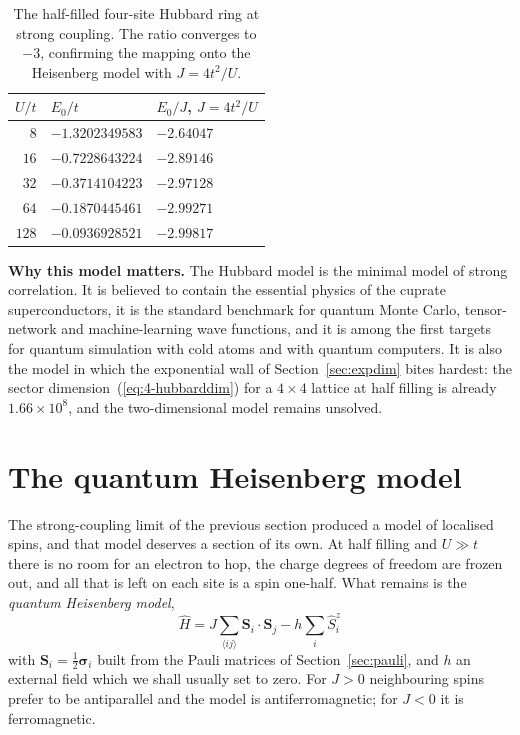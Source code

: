 \begin{table}[h]
\centering
\renewcommand{\arraystretch}{1.25}
\setlength{\tabcolsep}{14pt}
\begin{tabular}{rll}
\toprule
$U/t$ & $E_0/t$ & $E_0/J$, \quad $J=4t^2/U$\\
\midrule
$8$   & $-1.3202349583$ & $-2.64047$\\
$16$  & $-0.7228643224$ & $-2.89146$\\
$32$  & $-0.3714104223$ & $-2.97128$\\
$64$  & $-0.1870445461$ & $-2.99271$\\
$128$ & $-0.0936928521$ & $-2.99817$\\
\bottomrule
\end{tabular}
\caption{The half-filled four-site Hubbard ring at strong coupling.  The ratio
converges to $-3$, confirming the mapping onto the Heisenberg model with
$J=4t^2/U$.}
\label{tab:hubbardstrong}
\end{table}

\begin{notebox}
\textbf{Why this model matters.} The Hubbard model is the minimal model of
strong correlation.  It is believed to contain the essential physics of the
cuprate superconductors, it is the standard benchmark for quantum Monte Carlo,
tensor-network and machine-learning wave functions, and it is among the first
targets for quantum simulation with cold atoms and with quantum computers.  It
is also the model in which the exponential wall of Section~\ref{sec:expdim}
bites hardest: the sector dimension~(\ref{eq:4-hubbarddim}) for a $4\times4$
lattice at half filling is already $1.66\times10^8$, and the two-dimensional
model remains unsolved.
\end{notebox}

\section{The quantum Heisenberg model}
\label{sec:heisenberg}

The strong-coupling limit of the previous section produced a model of
localised spins, and that model deserves a section of its own.  At half
filling and $U\gg t$ there is no room for an electron to hop, the charge
degrees of freedom are frozen out, and all that is left on each site is a spin
one-half.  What remains is the \emph{quantum Heisenberg model},
\begin{equation}
  \boxed{\;
  \hat{H} = J\sum_{\langle ij\rangle}\bm{S}_i\cdot\bm{S}_j
    - h\sum_i \hat{S}^z_i \;}
  \label{eq:4-heisenbergH}
\end{equation}
with $\bm{S}_i=\tfrac12\bm{\sigma}_i$ built from the Pauli matrices of
Section~\ref{sec:pauli}, and $h$ an external field which we shall usually set
to zero.  For $J>0$ neighbouring spins prefer to be antiparallel and the model
is antiferromagnetic; for $J<0$ it is ferromagnetic.

